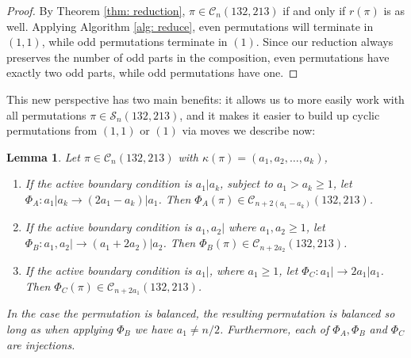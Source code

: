 \documentclass[11pt]{article}
\renewcommand\S{\mathcal S}
\newcommand\C{\mathcal C}
\newtheorem{lemma}[theorem]{Lemma}
\theoremstyle{definition}
\begin{document}
\begin{proof}
By Theorem \ref{thm: reduction}, $\pi \in \C_n(132,213)$ if and only if $r(\pi)$ is as well. Applying Algorithm \ref{alg: reduce}, even permutations will terminate in $(1,1)$, while odd permutations terminate in $(1)$. Since our reduction always preserves the number of odd parts in the composition, even permutations have exactly two odd parts, while odd permutations have one.
\end{proof}

This new perspective has two main benefits:  it allows us to more easily work with all permutations $\pi \in \S_n(132,213)$, and it makes it easier to build up cyclic permutations from $(1,1)$ or $(1)$ via moves we describe now:

\begin{lemma} \label{lem: moves}
    Let $\pi \in \C_n(132,213)$ with $\kappa(\pi) = (a_1,a_2,\dots,a_k)$,
    \begin{enumerate}
        \item If the active boundary condition is $a_1|a_k$, subject to $a_1 > a_k \geq 1$, let $\Phi_A: a_1|a_k \to (2a_1-a_k)|a_1$. Then $\Phi_A(\pi) \in \C_{n+2(a_1-a_k)}(132,213)$.
        \item If the active boundary condition is $a_1,a_2|$ where $a_1,a_2 \geq 1$, let $\Phi_B: a_1,a_2| \to (a_1+2a_2)|a_2$. Then $\Phi_B(\pi) \in \C_{n+2a_2}(132,213)$.
        \item If the active boundary condition is $a_1|$, where $a_1 \geq 1$, let $\Phi_C: a_1| \to 2a_1|a_1$. Then $\Phi_C(\pi) \in \C_{n+2a_1}(132,213)$.
    \end{enumerate}
    In the case the permutation is balanced, the resulting permutation is balanced so long as when applying $\Phi_B$ we have $a_1 \not= n/2$. Furthermore, each of $\Phi_A, \Phi_B$ and $\Phi_C$ are injections.
\end{lemma}
\end{document}
